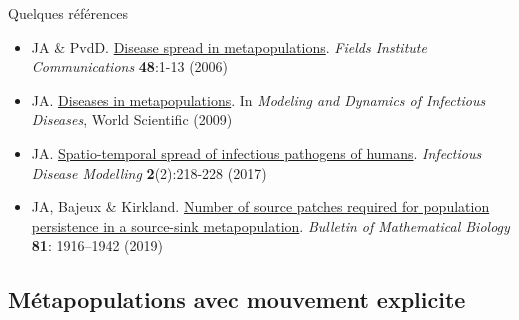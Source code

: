 \documentclass[aspectratio=169]{beamer}\usepackage[]{graphicx}\usepackage[]{xcolor}
\begin{document}
\begin{frame}{Quelques références}
	\begin{itemize}
		\item JA \& PvdD. \href{https://julien-arino.github.io/assets/pdf/papers/2006_ArinoPvdD-FIC48.pdf}{Disease spread in metapopulations}. \emph{Fields Institute Communications} \textbf{48}:1-13 (2006) \nocite{ArinoVdD2006a}
		\vfill
		\item JA. \href{https://julien-arino.github.io/assets/pdf/papers/2009_Arino-metapopulations.pdf}{Diseases in metapopulations}. In \emph{Modeling and Dynamics of Infectious Diseases}, World Scientific (2009) \nocite{Arino2009}
		\vfill
		\item JA. \href{https://doi.org/10.1016/j.idm.2017.05.001}{Spatio-temporal spread of infectious pathogens of humans}. \emph{Infectious Disease Modelling} \textbf{2}(2):218-228 (2017) \nocite{Arino2017}
		\vfill
		\item JA, Bajeux \& Kirkland. \href{https://doi.org/10.1007/s11538-019-00593-1}{Number of source patches required for population persistence in a source-sink metapopulation}. \emph{Bulletin of Mathematical Biology} \textbf{81}: 1916–1942 (2019) \nocite{ArinoBajeuxKirkland2019}
	\end{itemize}
\end{frame}


\subsection[Mouvement explicite]{Métapopulations avec mouvement explicite}


\end{document}
